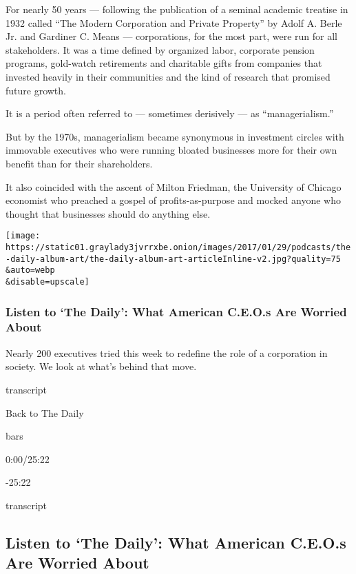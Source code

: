 For nearly 50 years --- following the publication of a seminal academic
treatise in 1932 called ``The Modern Corporation and Private Property''
by Adolf A. Berle Jr. and Gardiner C. Means --- corporations, for the
most part, were run for all stakeholders. It was a time defined by
organized labor, corporate pension programs, gold-watch retirements and
charitable gifts from companies that invested heavily in their
communities and the kind of research that promised future growth.

It is a period often referred to --- sometimes derisively --- as
``managerialism.''

But by the 1970s, managerialism became synonymous in investment circles
with immovable executives who were running bloated businesses more for
their own benefit than for their shareholders.

It also coincided with the ascent of Milton Friedman, the University of
Chicago economist who preached a gospel of profits-as-purpose and mocked
anyone who thought that businesses should do anything else.

\texttt{[image: https://static01.graylady3jvrrxbe.onion/images/2017/01/29/podcasts/the-daily-album-art/the-daily-album-art-articleInline-v2.jpg?quality=75\\\&auto=webp\\\&disable=upscale]}

\hypertarget{listen-to-the-daily-what-american-ceos-are-worried-about}{%
\subsubsection{Listen to `The Daily': What American C.E.O.s Are Worried
About}\label{listen-to-the-daily-what-american-ceos-are-worried-about}}

Nearly 200 executives tried this week to redefine the role of a
corporation in society. We look at what's behind that move.

transcript

Back to The Daily

bars

0:00/25:22

-25:22

transcript

\hypertarget{listen-to-the-daily-what-american-ceos-are-worried-about-1}{%
\subsection{Listen to `The Daily': What American C.E.O.s Are Worried
About}\label{listen-to-the-daily-what-american-ceos-are-worried-about-1}}


